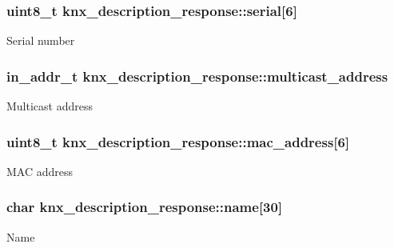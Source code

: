 \subsubsection[{\texorpdfstring{serial}{serial}}]{\setlength{\rightskip}{0pt plus 5cm}uint8\+\_\+t knx\+\_\+description\+\_\+response\+::serial\mbox{[}6\mbox{]}}\hypertarget{structknx__description__response_abad2d979f11eea0015185c7f177c7943}{}\label{structknx__description__response_abad2d979f11eea0015185c7f177c7943}
Serial number 
\subsubsection[{\texorpdfstring{multicast\+\_\+address}{multicast_address}}]{\setlength{\rightskip}{0pt plus 5cm}in\+\_\+addr\+\_\+t knx\+\_\+description\+\_\+response\+::multicast\+\_\+address}\hypertarget{structknx__description__response_a2307d33aad8c0a6245b2b17a4c202fb7}{}\label{structknx__description__response_a2307d33aad8c0a6245b2b17a4c202fb7}
Multicast address 
\subsubsection[{\texorpdfstring{mac\+\_\+address}{mac_address}}]{\setlength{\rightskip}{0pt plus 5cm}uint8\+\_\+t knx\+\_\+description\+\_\+response\+::mac\+\_\+address\mbox{[}6\mbox{]}}\hypertarget{structknx__description__response_ad6a357cb848d774479de61402dd574a5}{}\label{structknx__description__response_ad6a357cb848d774479de61402dd574a5}
M\+AC address 
\subsubsection[{\texorpdfstring{name}{name}}]{\setlength{\rightskip}{0pt plus 5cm}char knx\+\_\+description\+\_\+response\+::name\mbox{[}30\mbox{]}}\hypertarget{structknx__description__response_af448ef6b2aaaaefbb1cbd9f6c8c4b072}{}\label{structknx__description__response_af448ef6b2aaaaefbb1cbd9f6c8c4b072}
Name 
